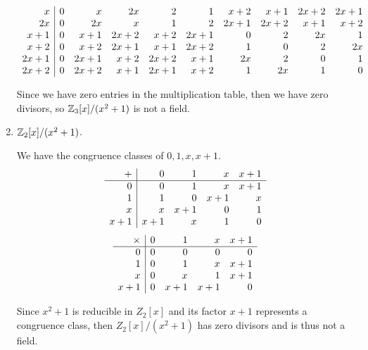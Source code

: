 \documentclass[../hw6]{subfiles}
\begin{document}
\begin{enumerate}[label=\roman*)]
\[\begin{array}{r | r r r r r r r r r}
			      x      & 0 & x    & 2x   & 2    & 1    & x+2  & x+1  & 2x+2 & 2x+1 \\
			      2x     & 0 & 2x   & x    & 1    & 2    & 2x+1 & 2x+2 & x+1  & x+2  \\
			      x+1    & 0 & x+1  & 2x+2 & x+2  & 2x+1 & 0    & 2    & 2x   & 1    \\
			      x+2    & 0 & x+2  & 2x+1 & x+1  & 2x+2 & 1    & 0    & 2    & 2x   \\
			      2x+1   & 0 & 2x+1 & x+2  & 2x+2 & x+1  & 2x   & 2    & 0    & 1    \\
			      2x+2   & 0 & 2x+2 & x+1  & 2x+1 & x+2  & 1    & 2x   & 1    & 0    \\
		      \end{array}\]

	      Since we have zero entries in the multiplication table, then we have zero divisors, so $\mathbb{Z}_3[x]/(x^2 + 1)$ is not a field.

	\item $\mathbb{Z}_2[x]/(x^2+1)$.

	      We have the congruence classes of $0,1,x,x+1$.
	      \[\begin{array}{r | r r r r}
			      +   & 0   & 1   & x   & x+1 \\
			      \hline
			      0   & 0   & 1   & x   & x+1 \\
			      1   & 1   & 0   & x+1 & x   \\
			      x   & x   & x+1 & 0   & 1   \\
			      x+1 & x+1 & x   & 1   & 0   \\
		      \end{array}\]
	      \[\begin{array}{r | r r r r}
			      \times & 0 & 1   & x   & x+1 \\
			      \hline
			      0      & 0 & 0   & 0   & 0   \\
			      1      & 0 & 1   & x   & x+1 \\
			      x      & 0 & x   & 1   & x+1 \\
			      x+1    & 0 & x+1 & x+1 & 0   \\
		      \end{array}\]

	      Since $x^2+1$ is reducible in $Z_2[x]$ and its factor $x+1$ represents a congruence class, then  $Z_2[x]/(x^2+1)$ has zero divisors and is thus not a field.
\end{enumerate}
\end{document}
